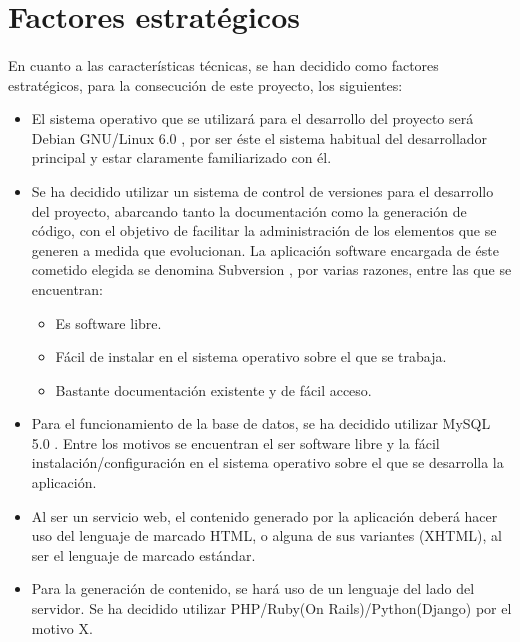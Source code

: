 \section{Factores estratégicos}\label{facEst}

\paragraph{}En cuanto a las características técnicas, se han decidido como
factores estratégicos, para la consecución de este proyecto, los siguientes:

\begin{itemize}
   \item El sistema operativo que se utilizará para el desarrollo del proyecto
   será Debian GNU/Linux 6.0 \cite{debian}, por ser éste el sistema habitual
   del desarrollador principal y estar claramente familiarizado con él.
   \item Se ha decidido utilizar un sistema de control de versiones para el
   desarrollo del proyecto, abarcando tanto la documentación como la generación
   de código, con el objetivo de facilitar la administración de los elementos
   que se generen a medida que evolucionan. La aplicación software encargada de
   éste cometido elegida se denomina Subversion \cite{subversion}, por varias
   razones, entre las que se encuentran:
   \begin{itemize}
      \item Es software libre.
      \item Fácil de instalar en el sistema operativo sobre el que se trabaja.
      \item Bastante documentación existente y de fácil acceso.
   \end{itemize}
   \item Para el funcionamiento de la base de datos, se ha decidido utilizar
   MySQL 5.0 \cite{mysql}. Entre los motivos se encuentran el ser software
   libre y la fácil instalación/configuración en el sistema operativo sobre el
   que se desarrolla la aplicación.
   \item Al ser un servicio web, el contenido generado por la aplicación deberá
   hacer uso del lenguaje de marcado HTML, o alguna de sus variantes (XHTML), al
   ser el lenguaje de marcado estándar.
   \item Para la generación de contenido, se hará uso de un lenguaje del lado
   del servidor. Se ha decidido utilizar PHP/Ruby(On Rails)/Python(Django) por
   el motivo X.
\end{itemize}

